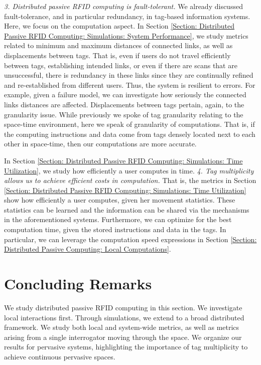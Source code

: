 \emph{3. Distributed passive RFID computing is fault-tolerant.} We already discussed fault-tolerance, and in particular redundancy, in tag-based information systems. Here, we focus on the computation aspect. In Section \ref{Section: Distributed Passive RFID Computing: Simulations: System Performance}, we study metrics related to minimum and maximum distances of connected links, as well as displacements between tags. That is, even if users do not travel efficiently between tags, establishing intended links, or even if there are scans that are unsuccessful, there is redundancy in these links since they are continually refined and re-established from different users. Thus, the system is resilient to errors. For example, given a failure model, we can investigate how seriously the connected links distances are affected. Displacements between tags pertain, again, to the granularity issue. While previously we spoke of tag granularity relating to the space-time environment, here we speak of granularity of computations. That is, if the computing instructions and data come from tags densely located next to each other in space-time, then our computations are more accurate.

In Section \ref{Section: Distributed Passive RFID Computing: Simulations: Time Utilization}, we study how efficiently a user computes in time. \emph{4. Tag multiplicity allows us to achieve efficient costs in computation.} That is, the metrics in Section \ref{Section: Distributed Passive RFID Computing: Simulations: Time Utilization} show how efficiently a user computes, given her movement statistics. These statistics can be learned and the information can be shared via the mechanisms in the aforementioned systems. Furthermore, we can optimize for the best computation time, given the stored instructions and data in the tags. In particular, we can leverage the computation speed expressions in Section \ref{Section: Distributed Passive Computing: Local Computations}.

\section{Concluding Remarks}
We study distributed passive RFID computing in this section. We investigate local interactions first. Through simulations, we extend to a broad distributed framework. We study both local and system-wide metrics, as well as metrics arising from a single interrogator moving through the space. We organize our results for pervasive systems, highlighting the importance of tag multiplicity to achieve continuous pervasive spaces.

